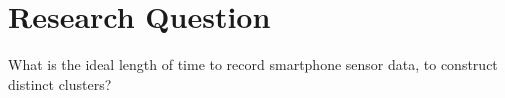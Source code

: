 \documentclass[12pt,a4paper]{article}
\begin{document}

















\section*{Research Question}
What is the ideal length of time to record smartphone sensor data, to construct distinct clusters?
\end{document}
